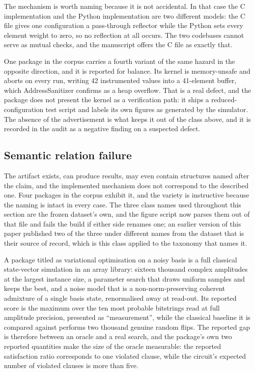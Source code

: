 \documentclass[sigconf,review]{acmart}
\begin{document}
The mechanism is worth naming because it is not accidental. In that case the
C implementation and the Python implementation are two different models: the C
file gives one configuration a pass-through reflector while the Python sets
every element weight to zero, so no reflection at all occurs. The two
codebases cannot serve as mutual checks, and the manuscript offers the C file
as exactly that.

One package in the corpus carries a fourth variant of the same hazard in the
opposite direction, and it is reported for balance. Its kernel is
memory-unsafe and aborts on every run, writing 42 instrumented values into a
41-element buffer, which AddressSanitizer confirms as a heap overflow. That is
a real defect, and the package does not present the kernel as a verification
path: it ships a reduced-configuration test script and labels its own figures
as generated by the simulator. The absence of the advertisement is what keeps
it out of the class above, and it is recorded in the audit as a
negative finding on a suspected defect.

\subsection{Semantic relation failure}
\label{sec:tax-semantic}

The artifact exists, can produce results, may even contain structures named
after the claim, and the implemented mechanism does not correspond to the
described one. Four packages in the corpus exhibit it, and the variety is
instructive because the naming is intact in every case. The three class names
used throughout this section are the frozen dataset's own, and the figure
script now parses them out of that file and fails the build if either side
renames one; an earlier version of this paper published two of the three under
different names from the dataset that is their source of record, which is this
class applied to the taxonomy that names it.

A package titled as variational optimisation on a noisy basis is a full
classical state-vector simulation in an array library: sixteen thousand
complex amplitudes at the largest instance size, a parameter search that draws
uniform samples and keeps the best, and a noise model that is a
non-norm-preserving coherent admixture of a single basis state, renormalised
away at read-out. Its reported score is the maximum over the ten most
probable bitstrings read at full amplitude precision, presented as
``measurement'', while the classical baseline it is compared against performs
two thousand genuine random flips. The reported gap is therefore between an
oracle and a real search, and the package's own two reported quantities make
the size of the oracle measurable: the reported satisfaction ratio
corresponds to one violated clause, while the circuit's expected number of
violated clauses is more than five.
\end{document}
